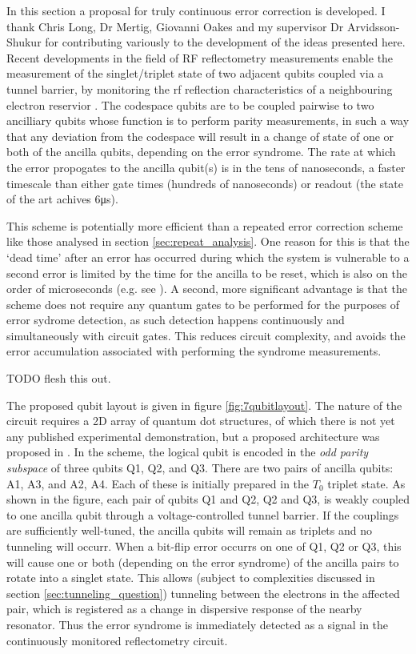 \documentclass{report}
\begin{document}
In this section a proposal for truly continuous error correction is developed. I thank Chris Long, Dr Mertig, Giovanni Oakes and my supervisor Dr Arvidsson-Shukur for contributing variously to the development of the ideas presented here. Recent developments in the field of RF reflectometry measurements enable the measurement of the singlet/triplet state of two adjacent qubits coupled via a tunnel barrier, by monitoring the rf reflection characteristics of a neighbouring electron reservior \cite{Oakes2022}. The codespace qubits are to be coupled pairwise to two ancilliary qubits whose function is to perform parity measurements, in such a way that any deviation from the codespace will result in a change of state of one or both of the ancilla qubits, depending on the error syndrome. The rate at which the error propogates to the ancilla qubit(s) is in the tens of nanoseconds, a faster timescale than either gate times (hundreds of nanoseconds) or readout (the state of the art \cite{Oakes2022} achives 6\unit{\micro\second}). 

This scheme is potentially more efficient than a repeated error correction scheme like those analysed in section \ref{sec:repeat_analysis}. One reason for this is that the `dead time' after an error has occurred during which the system is vulnerable to a second error is limited by the time for the ancilla to be reset, which is also on the order of microseconds (e.g. see \cite{Nakajima2019}). A second, more significant advantage is that the scheme does not require any quantum gates to be performed for the purposes of error sydrome detection, as such detection happens continuously and simultaneously with circuit gates. This reduces circuit complexity, and avoids the error accumulation associated with performing the syndrome measurements. 

TODO flesh this out.



The proposed qubit layout is given in figure \ref{fig:7qubitlayout}. The nature of the circuit requires a 2D array of quantum dot structures, of which there is not yet any published experimental demonstration, but a proposed architecture was proposed in \cite{Tadokoro2021_2}. In the scheme, the logical qubit is encoded in the \textit{odd parity subspace} of three qubits Q1, Q2, and Q3. There are two pairs of ancilla qubits: A1, A3, and A2, A4. Each of these is initially prepared in the $T_0$ triplet state. As shown in the figure, each pair of qubits Q1 and Q2, Q2 and Q3, is weakly coupled to one ancilla qubit through a voltage-controlled tunnel barrier. If the couplings are sufficiently well-tuned, the ancilla qubits will remain as triplets and no tunneling will occurr. When a bit-flip error occurrs on one of Q1, Q2 or Q3, this will cause one or both (depending on the error syndrome) of the ancilla pairs to rotate into a singlet state. This allows (subject to complexities discussed in section \ref{sec:tunneling_question}) tunneling between the electrons in the affected pair, which is registered as a change in dispersive response of the nearby resonator. Thus the error syndrome is immediately detected as a signal in the continuously monitored reflectometry circuit.
\end{document}
